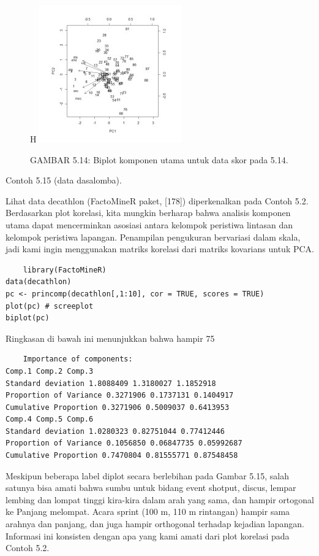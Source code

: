 \documentclass[a4paper,12pt]{article}
\theoremstyle{definition}
\begin{document}
\begin{figure} {H}
    \centering
    \includegraphics{gb/gambar 5.14.jpg}
    \caption{GAMBAR 5.14: Biplot komponen utama untuk data skor pada 5.14.}
    \label{fig:my_label}
\end{figure}

Contoh 5.15 (data dasalomba). 

Lihat data decathlon (FactoMineR paket, [178]) diperkenalkan pada Contoh 5.2. Berdasarkan plot korelasi, kita mungkin berharap bahwa analisis komponen utama dapat mencerminkan asosiasi antara kelompok peristiwa lintasan dan kelompok peristiwa lapangan. Penampilan pengukuran bervariasi dalam skala, jadi kami ingin menggunakan matriks korelasi dari matriks kovarians untuk PCA.

\begin{lstlisting}
    library(FactoMineR)
data(decathlon)
pc <- princomp(decathlon[,1:10], cor = TRUE, scores = TRUE)
plot(pc) # screeplot
biplot(pc)
\end{lstlisting}

Ringkasan di bawah ini menunjukkan bahwa hampir 75%

\begin{lstlisting}
    Importance of components:
Comp.1 Comp.2 Comp.3
Standard deviation 1.8088409 1.3180027 1.1852918
Proportion of Variance 0.3271906 0.1737131 0.1404917
Cumulative Proportion 0.3271906 0.5009037 0.6413953
Comp.4 Comp.5 Comp.6
Standard deviation 1.0280323 0.82751044 0.77412446
Proportion of Variance 0.1056850 0.06847735 0.05992687
Cumulative Proportion 0.7470804 0.81555771 0.87548458
\end{lstlisting}

Meskipun beberapa label diplot secara berlebihan pada Gambar 5.15, salah satunya bisa amati bahwa sumbu untuk bidang event shotput, discus, lempar lembing dan lompat tinggi kira-kira dalam arah yang sama, dan hampir ortogonal ke Panjang melompat. Acara sprint (100 m, 110 m rintangan) hampir sama arahnya dan panjang, dan juga hampir orthogonal terhadap kejadian lapangan. Informasi ini konsisten dengan apa yang kami amati dari plot korelasi pada Contoh 5.2.
\end{document}
